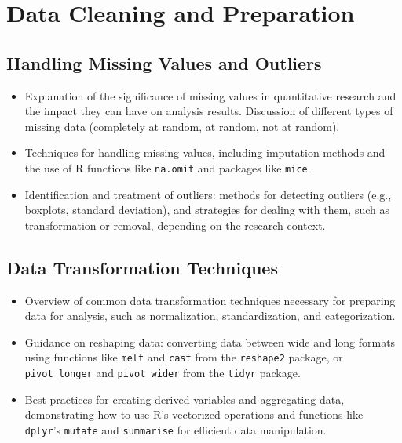 \documentclass[
]{book}
\begin{document}
\hypertarget{data-cleaning-and-preparation}{%
\section*{Data Cleaning and Preparation}\label{data-cleaning-and-preparation}}

\hypertarget{handling-missing-values-and-outliers}{%
\subsection*{Handling Missing Values and Outliers}\label{handling-missing-values-and-outliers}}

\begin{itemize}
\item
  Explanation of the significance of missing values in quantitative research and the impact they can have on analysis results. Discussion of different types of missing data (completely at random, at random, not at random).
\item
  Techniques for handling missing values, including imputation methods and the use of R functions like \texttt{na.omit} and packages like \texttt{mice}.
\item
  Identification and treatment of outliers: methods for detecting outliers (e.g., boxplots, standard deviation), and strategies for dealing with them, such as transformation or removal, depending on the research context.
\end{itemize}

\hypertarget{data-transformation-techniques}{%
\subsection*{Data Transformation Techniques}\label{data-transformation-techniques}}

\begin{itemize}
\item
  Overview of common data transformation techniques necessary for preparing data for analysis, such as normalization, standardization, and categorization.
\item
  Guidance on reshaping data: converting data between wide and long formats using functions like \texttt{melt} and \texttt{cast} from the \texttt{reshape2} package, or \texttt{pivot\_longer} and \texttt{pivot\_wider} from the \texttt{tidyr} package.
\item
  Best practices for creating derived variables and aggregating data, demonstrating how to use R's vectorized operations and functions like \texttt{dplyr}'s \texttt{mutate} and \texttt{summarise} for efficient data manipulation.
\end{itemize}
\end{document}
